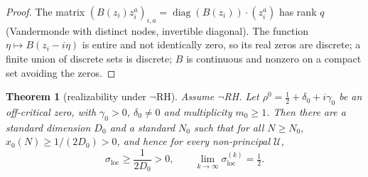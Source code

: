 \documentclass[11pt,reqno]{amsart}
\newtheorem{theorem}{Theorem}[section]
\theoremstyle{definition}
\newcommand{\half}{\tfrac12}
\begin{document}
\begin{proof}
The matrix \((B(z_i)z_i^a)_{i,a}=\operatorname{diag}(B(z_i))\cdot(z_i^a)\) has
rank \(q\) (Vandermonde with distinct nodes, invertible diagonal). The function
\(\eta\mapsto B(z_i-i\eta)\) is entire and not identically zero, so its real zeros are
discrete; a finite union of discrete sets is discrete; \(B\) is continuous and
nonzero on a compact set avoiding the zeros.
\end{proof}

\begin{theorem}[realizability under \(\neg\)RH]
\label{thm:realiz}
Assume \(\neg\)RH. Let
\(\rho^0=\half+\delta_0+i\gamma_0\) be an off-critical
zero, with \(\gamma_0>0\), \(\delta_0\neq0\) and multiplicity \(m_0\geq1\). Then there are a standard
dimension \(D_0\) and a standard \(N_0\) such that for all \(N\geq N_0\),
\(x_0(N)\geq 1/(2D_0)>0\), and hence for every non-principal \(\mathcal U\),
\[
\sigma_{\mathrm{loc}}\geq\frac{1}{2D_0}>0,\qquad
\lim_{k\to\infty}\sigma_{\mathrm{loc}}^{(k)}=\tfrac12.
\]
\end{theorem}
\end{document}
